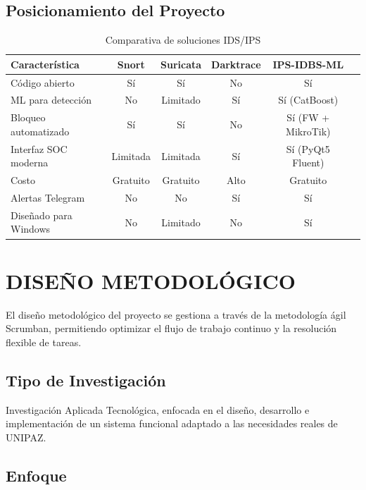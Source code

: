 \documentclass[12pt,letterpaper]{report}
\begin{document}
\section{Posicionamiento del Proyecto}

\begin{table}[H]
  \centering
  \caption{Comparativa de soluciones IDS/IPS}
  \label{tab:comparativa}
  \begin{tabularx}{\textwidth}{lccccc}
    \toprule
    \textbf{Característica} & \textbf{Snort} & \textbf{Suricata} & \textbf{Darktrace} & \textbf{IPS-IDBS-ML} \\
    \midrule
    Código abierto & Sí & Sí & No & Sí \\
    ML para detección & No & Limitado & Sí & Sí (CatBoost) \\
    Bloqueo automatizado & Sí & Sí & No & Sí (FW + MikroTik) \\
    Interfaz SOC moderna & Limitada & Limitada & Sí & Sí (PyQt5 Fluent) \\
    Costo & Gratuito & Gratuito & Alto & Gratuito \\
    Alertas Telegram & No & No & Sí & Sí \\
    Diseñado para Windows & No & Limitado & No & Sí \\
    \bottomrule
  \end{tabularx}
\end{table}

\chapter{DISEÑO METODOLÓGICO}

El diseño metodológico del proyecto se gestiona a través de la metodología ágil Scrumban, permitiendo optimizar el flujo de trabajo continuo y la resolución flexible de tareas.

\section{Tipo de Investigación}

Investigación Aplicada Tecnológica, enfocada en el diseño, desarrollo e implementación de un sistema funcional adaptado a las necesidades reales de UNIPAZ.

\section{Enfoque}
\end{document}
